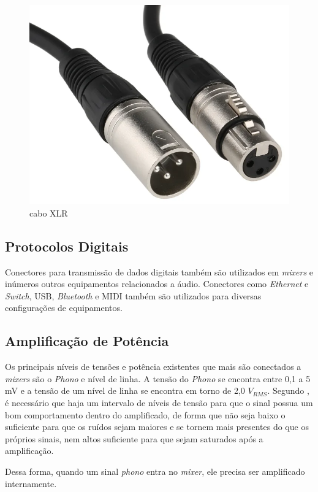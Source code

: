 \begin{figure}[h]
	\centering
    \includegraphics[scale=0.2]{figuras/fig23.png}
	\caption{cabo XLR \cite{hollylandWhatCable}}
	\label{fig23}
\end{figure}

\subsection{Protocolos Digitais}

Conectores para transmissão de dados digitais também são utilizados em \textit{mixers} e inúmeros outros equipamentos relacionados a áudio. Conectores como \textit{Ethernet} e \textit{Switch}, USB, \textit{Bluetooth} e MIDI também são utilizados para diversas configurações de equipamentos.
  
\subsection{Amplificação de Potência}

Os principais níveis de tensões e potência existentes que mais são conectados a \textit{mixers} são o \textit{Phono} e nível de linha. A tensão do \textit{Phono} se encontra entre 0,1 a 5 mV e a tensão de um nível de linha se encontra em torno de 2,0 $V_{RMS}$. Segundo \cite{self2013audio}, é necessário que haja um intervalo de níveis de tensão para que o sinal possua um bom comportamento dentro do amplificado, de forma que não seja baixo o suficiente para que os ruídos sejam maiores e se tornem mais presentes do que os próprios sinais, nem altos suficiente para que sejam saturados após a amplificação. 
\par
Dessa forma, quando um sinal \textit{phono} entra no \textit{mixer}, ele precisa ser amplificado internamente.


